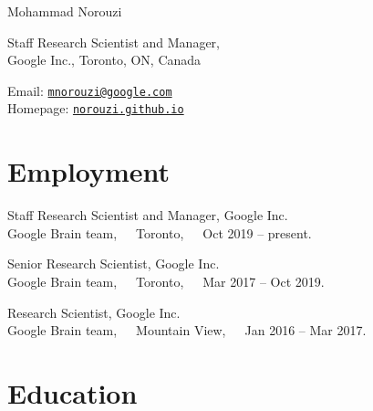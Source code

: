 \documentclass[10pt,letterpaper]{article}
\def\name{Mohammad Norouzi}
\renewenvironment{itemize}{
  \begin{list}{}{
    \setlength{\leftmargin}{1.5em}
  }
}{
  \end{list}
}
\begin{document}
{\huge \name}


\vspace{0.25in}

\begin{minipage}[t]{0.5\textwidth}
  Staff Research Scientist and Manager,\\
  Google Inc., Toronto, ON, Canada
\end{minipage}
\begin{minipage}[t]{0.4\textwidth}
  Email: \href{mailto:mnorouzi@google.com}{\tt mnorouzi@google.com} \\
  Homepage: \href{https://norouzi.github.io/}{\tt norouzi.github.io} \\
\end{minipage}

\section*{Employment}

\begin{itemize}
  \item Staff Research Scientist and Manager, Google Inc.\\
    Google Brain team,~~~Toronto,~~~Oct 2019 -- present.
  \item Senior Research Scientist, Google Inc.\\
    Google Brain team,~~~Toronto,~~~Mar 2017 -- Oct 2019.
  \item Research Scientist, Google Inc.\\
    Google Brain team,~~~Mountain View,~~~Jan 2016 -- Mar 2017.
\end{itemize}

\section*{Education}
\end{document}

